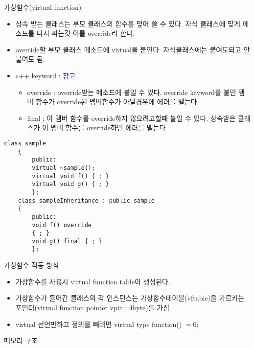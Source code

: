 \documentclass[10pt]{beamer}
\begin{document}
\begin{frame}{가상함수(virtual function)}
    \begin{itemize}
        \item 상속 받는 클래스는 부모 클래스의 함수를 덮어 쓸 수 있다. 자식 클래스에 맞게 메소드를 다시 짜는것 이를 override라 한다.
        \item override할 부모 클래스 메소드에 virtual을 붙인다. 자식클래스에는 붙여도되고 안붙여도 됨.
        \item c++ keyword : \href{https://youtu.be/JMw0F8FFe80}{\textcolor{blue}{참고}}
        \begin{itemize}
            \item  override : override받는 메소드에 붙일 수 있다. override keyword를 붙인 멤버 함수가 override된 멤버함수가 아닐경우에 에러를 뱉는다.
            \item  final : 이 멤버 함수를 override하지 않으려고할때 붙일 수 있다. 상속받은 클래스가 이 멤버 함수를 override하면 에러를 뱉는다
        \end{itemize}
    \end{itemize}
    
    \begin{lstlisting}[style = CStyle]
    class sample
    {
        public:
        virtual ~sample();
        virtual void f() { ; }
        virtual void g() { ; }
        };
    class sampleInheritance : public sample
    {
        public:
        void f() override
        { ; }
        void g() final { ; }
        };
    \end{lstlisting}
\end{frame}


\begin{frame}{가상함수 작동 방식}
    \begin{itemize}
        \item 가상함수를 사용시 virtual function table이 생성된다.
        \item 가상함수가 들어간 클래스의 각 인스턴스는 가상함수테이블(vftable)을 가르키는 포인터(virtual function pointer vptr : 4byte)를 가짐
        \item virtual 선언만하고 정의를 빼려면 virtual type function() $=0$;
    \end{itemize}
\end{frame}


\begin{frame}[fragile]{메모리 구조}
    
\end{frame}    
\end{document}
